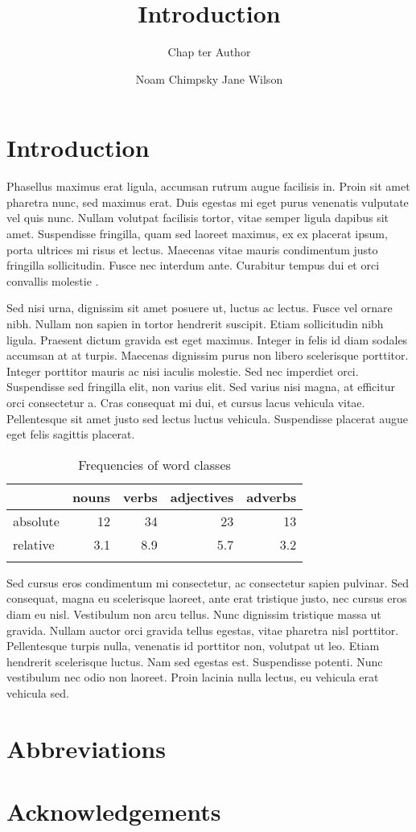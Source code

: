 \documentclass[output=paper]{langscibook}
\title{Introduction}
\author{%
 Chap ter Author\affiliation{University of Eden}\and
 Noam Chimpsky\affiliation{University of Pluto}\lastand
 Jane Wilson\affiliation{National Institute for Language}
}
\begin{document}
\maketitle
\section{Introduction}
Phasellus maximus erat ligula, accumsan rutrum augue facilisis in. Proin sit amet pharetra nunc, sed maximus erat. Duis egestas mi eget purus venenatis vulputate vel quis nunc. Nullam volutpat facilisis tortor, vitae semper ligula dapibus sit amet. Suspendisse fringilla, quam sed laoreet maximus, ex ex placerat ipsum, porta ultrices mi risus et lectus. Maecenas vitae mauris condimentum justo fringilla sollicitudin. Fusce nec interdum ante. Curabitur tempus dui et orci convallis molestie \citep{Chomsky1957}.



Sed nisi urna, dignissim sit amet posuere ut, luctus ac lectus. Fusce vel ornare nibh. Nullam non sapien in tortor hendrerit suscipit. Etiam sollicitudin nibh ligula. Praesent dictum gravida est eget maximus. Integer in felis id diam sodales accumsan at at turpis. Maecenas dignissim purus non libero scelerisque porttitor. Integer porttitor mauris ac nisi iaculis molestie. Sed nec imperdiet orci. Suspendisse sed fringilla elit, non varius elit. Sed varius nisi magna, at efficitur orci consectetur a. Cras consequat mi dui, et cursus lacus vehicula vitae. Pellentesque sit amet justo sed lectus luctus vehicula. Suspendisse placerat augue eget felis sagittis placerat.


\begin{table}
\caption{Frequencies of word classes}
\label{tab:1:frequencies}
 \begin{tabular}{lrrrr}
  \lsptoprule
            & nouns & verbs & adjectives & adverbs\\
  \midrule
  absolute  &   12 &    34  &    23     & 13\\
  relative  &   3.1 &   8.9 &    5.7    & 3.2\\
  \lspbottomrule
 \end{tabular}
\end{table}


Sed cursus eros condimentum mi consectetur, ac consectetur sapien pulvinar. Sed consequat, magna eu scelerisque laoreet, ante erat tristique justo, nec cursus eros diam eu nisl. Vestibulum non arcu tellus. Nunc dignissim tristique massa ut gravida. Nullam auctor orci gravida tellus egestas, vitae pharetra nisl porttitor. Pellentesque turpis nulla, venenatis id porttitor non, volutpat ut leo. Etiam hendrerit scelerisque luctus. Nam sed egestas est. Suspendisse potenti. Nunc vestibulum nec odio non laoreet. Proin lacinia nulla lectus, eu vehicula erat vehicula sed.

\section*{Abbreviations}
\section*{Acknowledgements}

\sloppy
\printbibliography[heading=subbibliography,notkeyword=this]
\end{document}
